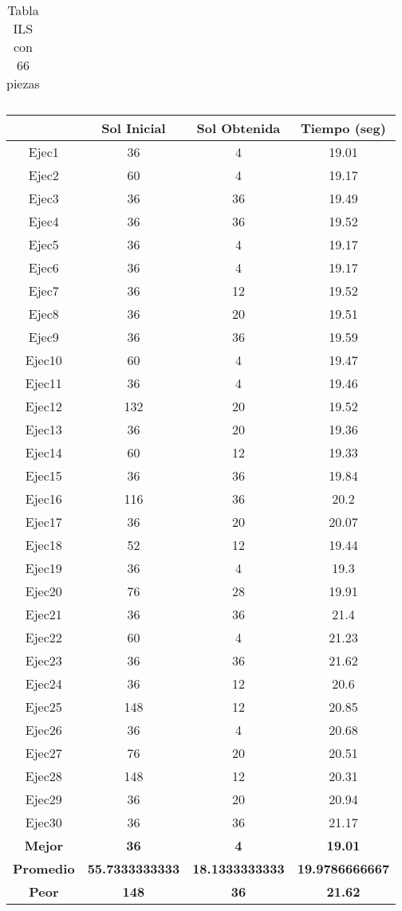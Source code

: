 \begin{center}
\begin{table}
\begin{tabular}{|c|c|c|c|}
\end{tabular}
\caption{Tabla ILS con 66 piezas}
\end{table}

\begin{table}

\begin{tabular}{|c|c|c|c|}



\hline
 & {\bf Sol Inicial} & {\bf Sol Obtenida} & {\bf Tiempo (seg)} \\
\hline
Ejec1 & 36 & 4  & 19.01 \\
\hline
Ejec2 & 60 & 4  & 19.17 \\
\hline
Ejec3 & 36 & 36  & 19.49 \\
\hline
Ejec4 & 36 & 36  & 19.52 \\
\hline
Ejec5 & 36 & 4  & 19.17 \\
\hline
Ejec6 & 36 & 4  & 19.17 \\
\hline
Ejec7 & 36 & 12  & 19.52 \\
\hline
Ejec8 & 36 & 20  & 19.51 \\
\hline
Ejec9 & 36 & 36  & 19.59 \\
\hline
Ejec10 & 60 & 4  & 19.47 \\
\hline
Ejec11 & 36 & 4  & 19.46 \\
\hline
Ejec12 & 132 & 20  & 19.52 \\
\hline
Ejec13 & 36 & 20  & 19.36 \\
\hline
Ejec14 & 60 & 12  & 19.33 \\
\hline
Ejec15 & 36 & 36  & 19.84 \\
\hline
Ejec16 & 116 & 36  & 20.2 \\
\hline
Ejec17 & 36 & 20  & 20.07 \\
\hline
Ejec18 & 52 & 12  & 19.44 \\
\hline
Ejec19 & 36 & 4  & 19.3 \\
\hline
Ejec20 & 76 & 28  & 19.91 \\
\hline
Ejec21 & 36 & 36  & 21.4 \\
\hline
Ejec22 & 60 & 4  & 21.23 \\
\hline
Ejec23 & 36 & 36  & 21.62 \\
\hline
Ejec24 & 36 & 12  & 20.6 \\
\hline
Ejec25 & 148 & 12  & 20.85 \\
\hline
Ejec26 & 36 & 4  & 20.68 \\
\hline
Ejec27 & 76 & 20  & 20.51 \\
\hline
Ejec28 & 148 & 12  & 20.31 \\
\hline
Ejec29 & 36 & 20  & 20.94 \\
\hline
Ejec30 & 36 & 36  & 21.17 \\
\hline
{\bf Mejor} & {\bf 36} & {\bf 4} & {\bf 19.01} \\
\hline
{\bf Promedio} & {\bf 55.7333333333} & {\bf 18.1333333333} & {\bf 19.9786666667} \\
\hline
{\bf Peor} & {\bf 148} & {\bf 36} & {\bf 21.62} \\
\hline


\end{tabular}
\end{table}
\end{center}
